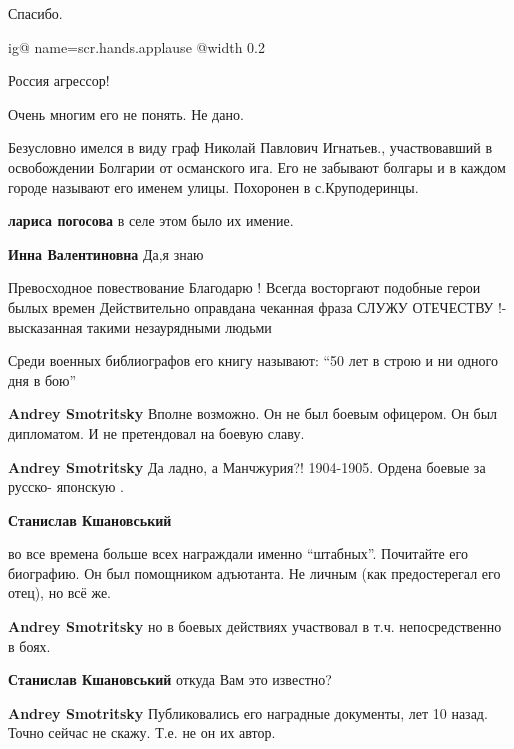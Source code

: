 \begin{itemize}
Спасибо.


\ifcmt
  ig@ name=scr.hands.applause
  @width 0.2
\fi

Россия агрессор!

Очень многим его не понять. Не дано.


Безусловно имелся в виду граф Николай Павлович
Игнатьев., участвовавший в освобождении Болгарии от османского ига. Его не
забывают болгары и в каждом городе называют его именем улицы.
Похоронен в с.Круподеринцы.

\begin{itemize} %
\textbf{лариса погосова} в селе этом было их имение.

\textbf{Инна Валентиновна}
Да,я знаю
\end{itemize} %

Превосходное повествование Благодарю !
Всегда восторгают подобные герои былых времен
Действительно оправдана чеканная фраза СЛУЖУ ОТЕЧЕСТВУ !- высказанная такими незаурядными людьми

Среди военных библиографов его книгу называют: \enquote{50 лет в строю и ни одного дня в бою}

\begin{itemize} %
\textbf{Andrey Smotritsky} Вполне возможно. Он не был боевым офицером. Он был дипломатом. И не претендовал на боевую славу.

\textbf{Andrey Smotritsky} Да ладно, а Манчжурия?! 1904-1905. Ордена боевые за русско- японскую .

\begin{itemize} %
\textbf{Станислав Кшановський} 

во все времена больше всех награждали именно \enquote{штабных}. Почитайте его
биографию. Он был помощником адъютанта. Не личным (как предостерегал его отец),
но всё же.


\textbf{Andrey Smotritsky} но в боевых действиях участвовал в т.ч. непосредственно в боях.

\textbf{Станислав Кшановський} откуда Вам это известно?

\textbf{Andrey Smotritsky} Публиковались его наградные документы, лет 10 назад. Точно сейчас не скажу. Т.е. не он их автор.
\end{itemize} %


\end{itemize}
\end{itemize}
